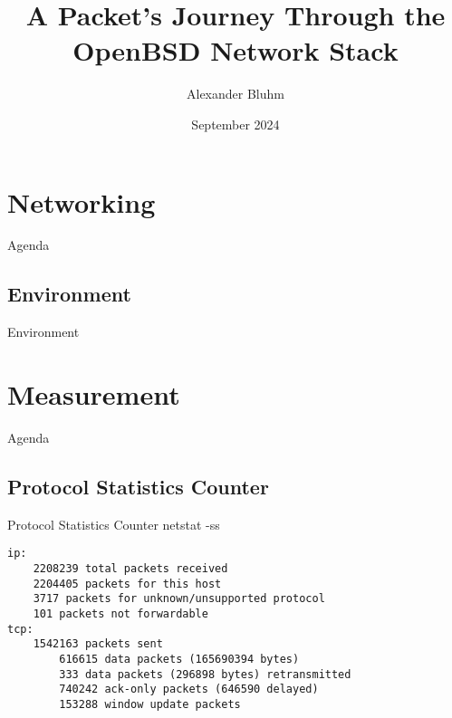 \documentclass[14pt]{beamer}
\author{Alexander Bluhm}
\title{A Packet's Journey Through the OpenBSD Network Stack}
\institute{genua GmbH\\ \url{bluhm@genua.de}\\ \url{bluhm@openbsd.org}}
\date{September 2024}
\begin{document}
\begin{frame}
\titlepage
\end{frame}

\setcounter{tocdepth}{1}
\section{Networking}
\begin{frame}{Agenda}
\tableofcontents[currentsection]
\end{frame}

\subsection{Environment}
\begin{frame}{Environment}
\end{frame}

\section{Measurement}
\begin{frame}{Agenda}
\tableofcontents[currentsection]
\end{frame}

\subsection{Protocol Statistics Counter}
\begin{frame}[fragile]{Protocol Statistics Counter}
netstat -ss
\scriptsize
\begin{verbatim}
ip:
    2208239 total packets received
    2204405 packets for this host
    3717 packets for unknown/unsupported protocol
    101 packets not forwardable
tcp:
    1542163 packets sent
        616615 data packets (165690394 bytes)
        333 data packets (296898 bytes) retransmitted
        740242 ack-only packets (646590 delayed)
        153288 window update packets
\end{verbatim}
\end{frame}
\end{document}

